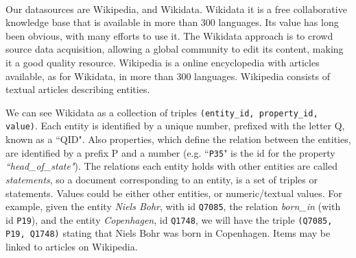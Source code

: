 \paragraph{}
Our datasources are Wikipedia, and Wikidata. Wikidata it is a free collaborative knowledge base that is available in more than 300 languages. Its value has long been obvious, with many efforts to use it. The Wikidata approach is to crowd source data acquisition, allowing a global community to edit its content, making it a good quality resource.  Wikipedia is a online encyclopedia with articles available, as for Wikidata, in more than 300 languages. Wikipedia consists of textual articles describing entities. %



We can see Wikidata as a collection of triples \texttt{(entity\_id, property\_id, value)}. Each entity is identified by a unique number, prefixed with the letter Q, known as a ``QID". Also properties, which define the relation between the entities, are identified by a prefix P and a number (e.g. ``\texttt{P35}" is the id for the property \textit{``head\_of\_state"}). The relations each entity holds with other entities are called \textit{statements}, so a document corresponding to an entity, is a set of triples or statements. Values could be either other entities, or numeric/textual values.  For example, given the entity \textit{Niels Bohr}, with id \texttt{Q7085}, the relation \textit{born\_in} (with id \texttt{P19}), and the entity \textit{Copenhagen}, id \texttt{Q1748}, we will have the triple \texttt{(Q7085, P19, Q1748)} stating that Niels Bohr was born in Copenhagen. Items may be linked to articles on Wikipedia.


